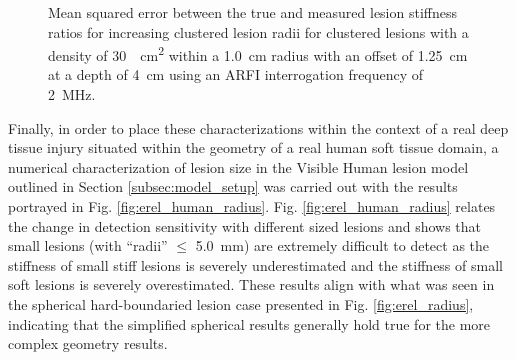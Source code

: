 			\begin{figure}[!htb]
				\centering
				\caption[Shear-wave speed quantified mean squared error related to small lesion cluster density]{Mean squared error between the true and measured lesion stiffness ratios for increasing clustered lesion radii for clustered lesions with a density of \SI{30}{\per\cm\squared} within a \SI{1.0}{cm} radius with an offset of \SI{1.25}{\cm} at a depth of \SI{4}{\cm} using an ARFI interrogation frequency of \SI{2}{\MHz}.}
				\label{fig:erel_cluster_radius_mse}
			\end{figure}

			Finally, in order to place these characterizations within the context of a real deep tissue injury situated within the geometry of a real human soft tissue domain, a numerical characterization of lesion size in the Visible Human lesion model outlined in Section \ref{subsec:model_setup} was carried out with the results portrayed in Fig. \ref{fig:erel_human_radius}. Fig. \ref{fig:erel_human_radius} relates the change in detection sensitivity with different sized lesions and shows that small lesions (with ``radii'' $\leq$ \SI{5.0}{\mm}) are extremely difficult to detect as the stiffness of small stiff lesions is severely underestimated and the stiffness of small soft lesions is severely overestimated. These results align with what was seen in the spherical hard-boundaried lesion case presented in Fig. \ref{fig:erel_radius}, indicating that the simplified spherical results generally hold true for the more complex geometry results.

